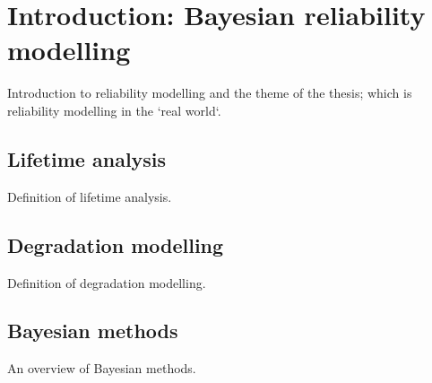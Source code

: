 \chapter{Introduction: Bayesian reliability modelling}\label{chap:chapter1}

Introduction to reliability modelling and the theme of the thesis; which is reliability modelling in the `real world`.

\section{Lifetime analysis}

Definition of lifetime analysis.

\section{Degradation modelling}

Definition of degradation modelling.

\section{Bayesian methods}

An overview of Bayesian methods.